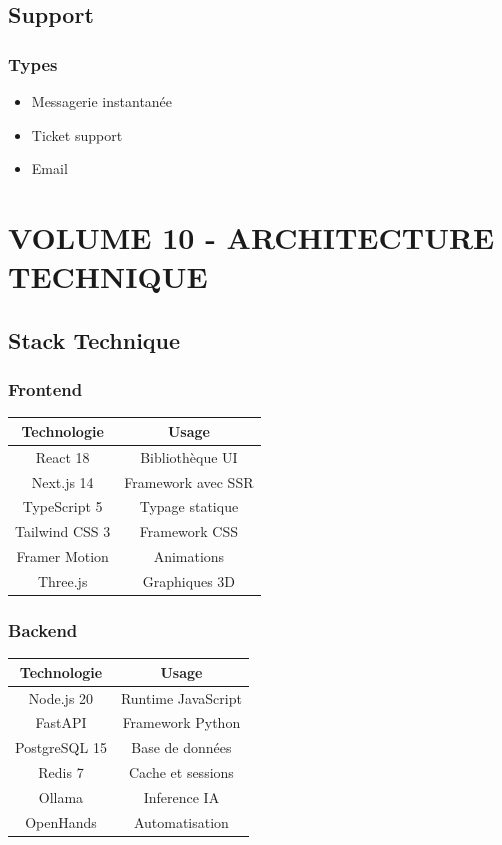 \documentclass[12pt,a4paper,oneside]{book}
\begin{document}
\chapter{Support}

\section{Types}
\begin{itemize}
\item Messagerie instantanée
\item Ticket support
\item Email
\end{itemize}

\part{VOLUME 10 - ARCHITECTURE TECHNIQUE}

\chapter{Stack Technique}

\section{Frontend}
\bigskip
\begin{center}
\begin{tabular}{|c|c|}
\hline
\rowcolor{electronblue}
\color{white}\textbf{Technologie} & \color{white}\textbf{Usage} \\
\hline
React 18 & Bibliothèque UI \\
\hline
Next.js 14 & Framework avec SSR \\
\hline
TypeScript 5 & Typage statique \\
\hline
Tailwind CSS 3 & Framework CSS \\
\hline
Framer Motion & Animations \\
\hline
Three.js & Graphiques 3D \\
\hline
\end{tabular}
\end{center}

\section{Backend}
\bigskip
\begin{center}
\begin{tabular}{|c|c|}
\hline
\rowcolor{electronblue}
\color{white}\textbf{Technologie} & \color{white}\textbf{Usage} \\
\hline
Node.js 20 & Runtime JavaScript \\
\hline
FastAPI & Framework Python \\
\hline
PostgreSQL 15 & Base de données \\
\hline
Redis 7 & Cache et sessions \\
\hline
Ollama & Inference IA \\
\hline
OpenHands & Automatisation \\
\hline
\end{tabular}
\end{center}
\end{document}

